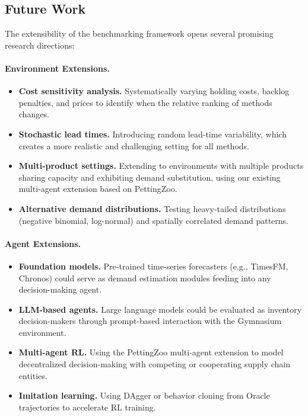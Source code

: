 \subsection{Future Work}

The extensibility of the benchmarking framework opens several
promising research directions:

\paragraph{Environment Extensions.}
\begin{itemize}
  \item \textbf{Cost sensitivity analysis.} Systematically varying
        holding costs, backlog penalties, and prices to identify when
        the relative ranking of methods changes.
  \item \textbf{Stochastic lead times.} Introducing random lead-time
        variability, which creates a more realistic and challenging
        setting for all methods.
  \item \textbf{Multi-product settings.} Extending to environments
        with multiple products sharing capacity and exhibiting
        demand substitution, using our existing multi-agent
        extension based on PettingZoo.
  \item \textbf{Alternative demand distributions.} Testing
        heavy-tailed distributions (negative binomial, log-normal)
        and spatially correlated demand patterns.
\end{itemize}

\paragraph{Agent Extensions.}
\begin{itemize}
  \item \textbf{Foundation models.} Pre-trained time-series forecasters
        (e.g., TimesFM, Chronos) could serve as demand estimation
        modules feeding into any decision-making agent.
  \item \textbf{LLM-based agents.} Large language models could be
        evaluated as inventory decision-makers through prompt-based
        interaction with the Gymnasium environment.
  \item \textbf{Multi-agent RL.} Using the PettingZoo multi-agent
        extension to model decentralized decision-making with
        competing or cooperating supply chain entities.
  \item \textbf{Imitation learning.} Using DAgger or behavior
        cloning from Oracle trajectories to accelerate RL training.
\end{itemize}

